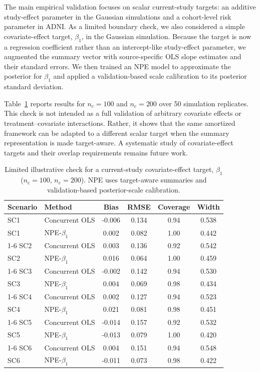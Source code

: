 The main empirical validation focuses on scalar current-study targets: an
additive study-effect parameter in the Gaussian simulations and a
cohort-level risk parameter in ADNI. As a limited boundary check, we also
considered a simple covariate-effect target, $\beta_1$, in the Gaussian
simulation. Because the target is now a regression coefficient rather than an
intercept-like study-effect parameter, we augmented the summary vector with
source-specific OLS slope estimates and their standard errors. We then trained
an NPE model to approximate the posterior for $\beta_1$ and applied a
validation-based scale calibration to its posterior standard deviation.

Table~\ref{tab:covariate-effect} reports results for $n_c=100$ and
$n_e=200$ over 50 simulation replicates. This check is not intended as a full
validation of arbitrary covariate effects or treatment--covariate
interactions. Rather, it shows that the same amortized framework can be
adapted to a different scalar target when the summary representation is made
target-aware. A systematic study of covariate-effect targets and their
overlap requirements remains future work.

\begin{table}[H]
\centering
\small
\caption{Limited illustrative check for a current-study covariate-effect
target, $\beta_1$ ($n_c=100$, $n_e=200$). NPE uses target-aware summaries and
validation-based posterior-scale calibration.}
\label{tab:covariate-effect}
\begin{tabular}{llcccc}
\toprule
Scenario & Method & Bias & RMSE & Coverage & Width \\
\midrule
SC1 & Concurrent OLS & -0.006 & 0.134 & 0.94 & 0.538 \\
SC1 & NPE-$\beta_1$ & 0.002 & 0.082 & 1.00 & 0.442 \\
\cmidrule(lr){1-6}
SC2 & Concurrent OLS & 0.003 & 0.136 & 0.92 & 0.542 \\
SC2 & NPE-$\beta_1$ & 0.016 & 0.064 & 1.00 & 0.459 \\
\cmidrule(lr){1-6}
SC3 & Concurrent OLS & -0.002 & 0.142 & 0.94 & 0.530 \\
SC3 & NPE-$\beta_1$ & 0.004 & 0.069 & 0.98 & 0.434 \\
\cmidrule(lr){1-6}
SC4 & Concurrent OLS & 0.002 & 0.127 & 0.94 & 0.523 \\
SC4 & NPE-$\beta_1$ & 0.021 & 0.081 & 0.98 & 0.451 \\
\cmidrule(lr){1-6}
SC5 & Concurrent OLS & -0.014 & 0.157 & 0.92 & 0.532 \\
SC5 & NPE-$\beta_1$ & -0.013 & 0.079 & 1.00 & 0.420 \\
\cmidrule(lr){1-6}
SC6 & Concurrent OLS & 0.004 & 0.151 & 0.94 & 0.548 \\
SC6 & NPE-$\beta_1$ & -0.011 & 0.073 & 0.98 & 0.422 \\
\bottomrule
\end{tabular}
\end{table}

